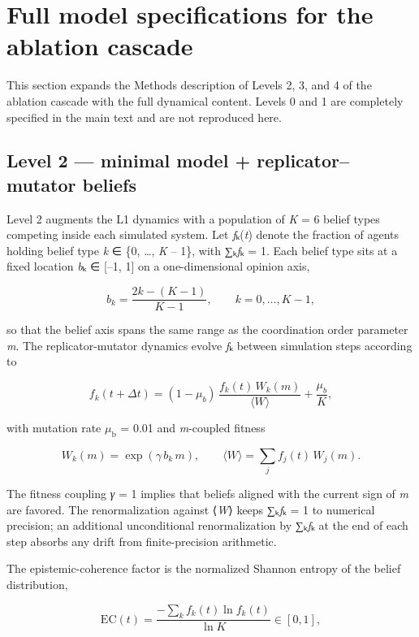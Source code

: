 \documentclass[11pt,letterpaper]{article}
\begin{document}
\section{Full model specifications for the ablation cascade}\label{full-model-specifications-for-the-ablation-cascade}

This section expands the Methods description of Levels 2, 3, and 4 of the ablation cascade with the full dynamical content. Levels 0 and 1 are completely specified in the main text and are not reproduced here.

\subsection{Level 2 --- minimal model + replicator--mutator beliefs}\label{level-2-minimal-model-replicatormutator-beliefs}

Level 2 augments the L1 dynamics with a population of \emph{K} = 6 belief types competing inside each simulated system. Let \emph{f}ₖ(\emph{t}) denote the fraction of agents holding belief type \emph{k} ∈ \{0, \ldots, \emph{K} -- 1\}, with ∑ₖ\emph{f}ₖ = 1. Each belief type sits at a fixed location \emph{b}ₖ ∈ {[}--1, 1{]} on a one-dimensional opinion axis,

\[
b_k = \frac{2k - (K-1)}{K-1}, \qquad k = 0, \ldots, K-1,
\]

so that the belief axis spans the same range as the coordination order parameter \emph{m}. The replicator-mutator dynamics evolve \emph{f}ₖ between simulation steps according to

\[
f_k(t + \Delta t) = (1 - \mu_b)\,\frac{f_k(t)\,W_k(m)}{\langle W \rangle} + \frac{\mu_b}{K},
\]

with mutation rate \(\mu_{\mathrm{b}}\) = 0.01 and \emph{m}-coupled fitness

\[
W_k(m) = \exp(\gamma\,b_k\,m), \qquad \langle W \rangle = \sum_j f_j(t)\,W_j(m).
\]

The fitness coupling \emph{γ} = 1 implies that beliefs aligned with the current sign of \emph{m} are favored. The renormalization against ⟨\emph{W}⟩ keeps ∑ₖ\emph{f}ₖ = 1 to numerical precision; an additional unconditional renormalization by ∑ₖ\emph{f}ₖ at the end of each step absorbs any drift from finite-precision arithmetic.

The epistemic-coherence factor is the normalized Shannon entropy of the belief distribution,

\[
\mathrm{EC}(t) = \frac{-\sum_k f_k(t) \ln f_k(t)}{\ln K} \in [0, 1],
\]
\end{document}
